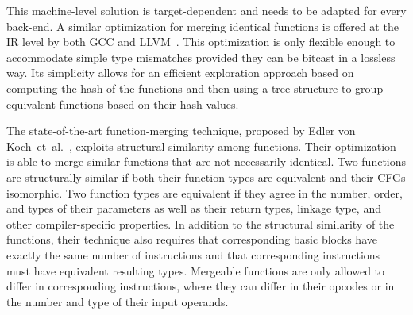 This machine-level solution is target-dependent and needs to be adapted for every back-end.
A similar optimization for merging identical functions %
is offered at the IR level by both GCC and LLVM~\cite{llvm-fm,livska14}.
This optimization is only flexible enough to accommodate simple type mismatches
provided they can be bitcast in a lossless way.
Its simplicity allows for an efficient exploration approach based on computing
the hash of the functions and then using a tree structure to group equivalent
functions based on their hash values.

The state-of-the-art function-merging technique, proposed by Edler von
Koch~et~al.~\cite{edler14}, exploits structural similarity among functions.
Their optimization is able to merge similar functions that are not necessarily
identical.
Two functions are structurally similar if both their function types are equivalent
and their CFGs isomorphic.
Two function types are equivalent if they agree in the number, order, and types
of their parameters as well as
their return types, linkage type, and other compiler-specific properties.
In addition to the structural similarity of the functions, their technique also
requires that corresponding basic blocks have exactly the same number of instructions
and that corresponding instructions must have equivalent resulting types.%
Mergeable functions are only allowed to differ in corresponding instructions,
where they can differ in their opcodes or in the number and type of their input operands.


